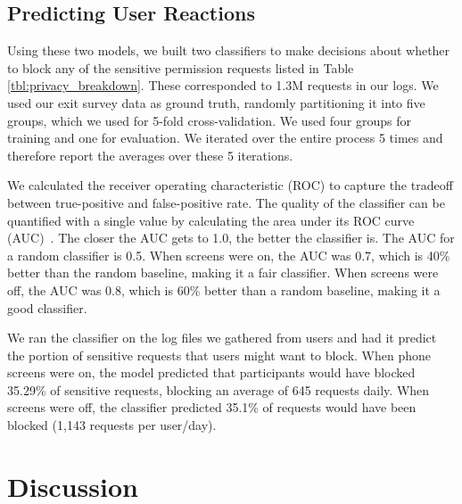 \documentclass[letterpaper,twocolumn,10pt]{article}
\begin{document}
\subsection{Predicting User Reactions}

Using these two models, we built two classifiers to make decisions about whether to block any of the sensitive permission requests listed in Table \ref{tbl:privacy_breakdown}. These corresponded to 1.3M requests in our logs. We used our exit survey data as ground truth, randomly partitioning it into five groups, which we used for 5-fold cross-validation. We used four groups for training and one for evaluation. We iterated over the entire process 5 times and therefore report the averages over these 5 iterations.

We calculated the receiver operating characteristic (ROC) to capture the tradeoff between true-positive and false-positive rate. The quality of the classifier can be quantified with a single value by calculating the area under its ROC curve (AUC)~\cite{roc}. The closer the AUC gets to 1.0, the better the classifier is. The AUC for a random classifier is 0.5. When screens were on, the AUC was 0.7, which is 40\% better than the random baseline, making it a fair classifier. When screens were off, the AUC was 0.8, which is 60\% better than a random baseline, making it a good classifier. 

We ran the classifier on the log files we gathered from users and had it predict the portion of sensitive requests that users might want to block. When phone screens were on, the model predicted that participants would have blocked 35.29\% of sensitive requests, blocking an average of 645 requests daily. When screens were off, the classifier predicted 35.1\% of requests would have been blocked (1,143 requests per user/day). 










\section{Discussion}
\end{document}
